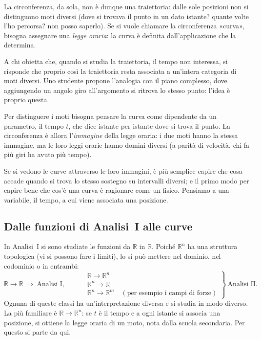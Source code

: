 La circonferenza, da sola, non è dunque una traiettoria: dalle sole posizioni non si
distinguono moti diversi (dove si trovava il punto in un dato istante? quante volte l'ho percorsa? non posso
saperlo). Se si vuole chiamare la circonferenza «curva», bisogna assegnare una
\emph{legge oraria}: la curva è definita dall'applicazione che la determina.

A chi obietta che, quando si studia la traiettoria, il tempo non interessa, si risponde
che proprio così la traiettoria resta associata a un'intera categoria di moti diversi.
Uno studente propone l'analogia con il piano complesso, dove aggiungendo un angolo giro
all'argomento si ritrova lo stesso punto: l'idea è proprio questa.

Per distinguere i moti bisogna pensare la curva come dipendente da un parametro, il
tempo $t$, che dice istante per istante dove si trova il punto. La circonferenza è
allora l'\emph{immagine} della legge oraria:
i due moti hanno la stessa immagine, ma le loro leggi orarie hanno domini diversi (a
parità di velocità, chi fa più giri ha avuto più tempo).

Se si vedono le curve attraverso le loro immagini, è più semplice capire che cosa accade
quando si trova lo stesso sostegno su intervalli diversi; e il primo modo per capire
bene che cos'è una curva è ragionare come un fisico.
Pensiamo a una variabile, il tempo, a cui viene associata una posizione.

\subsection{Dalle funzioni di Analisi~I alle curve}

In Analisi~I si sono studiate le funzioni da $\mathbb{R}$ in $\mathbb{R}$. Poiché
$\mathbb{R}^n$ ha una struttura topologica (vi si possono fare i limiti), lo si può
mettere nel dominio, nel codominio o in entrambi:
\[
\mathbb{R}\to\mathbb{R}\ \Longrightarrow\ \text{Analisi I},
\qquad
\left.\begin{aligned}
&\mathbb{R}\to\mathbb{R}^n\\
&\mathbb{R}^n\to\mathbb{R}\\
&\mathbb{R}^n\to\mathbb{R}^m\quad(\text{per esempio i campi di forze})
\end{aligned}\right\}\ \text{Analisi II}.
\]
Ognuna di queste classi ha un'interpretazione diversa e si studia in modo diverso. La
più familiare è $\mathbb{R}\to\mathbb{R}^n$: se $t$ è il tempo e a ogni istante si
associa una posizione, si ottiene la legge oraria di un moto, nota dalla scuola
secondaria. Per questo si parte da qui.

